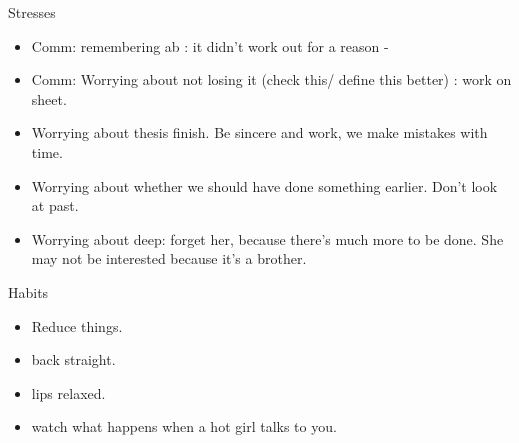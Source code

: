 \documentclass[serif, mathserif, final]{beamer}
\begin{document}
\begin{frame}{}
\begin{columns}
\begin{column}{0.25\linewidth}
\begin{block}{ Stresses}
\begin{itemize}
    \item \tiny Comm: remembering ab : it didn't work out for a reason - 
    \item \tiny Comm: Worrying about not losing it (check this/ define this better) : work on sheet.  

    \item \tiny Worrying about thesis finish. Be sincere and work, we make mistakes with time. 
    \item \tiny Worrying about whether we should have done something earlier. Don't look at past. 

    \item \tiny Worrying about deep: forget her, because there's much more to be done.  She may not be interested because it's a brother. 
    \end{itemize} 
  \end{block} 

  \begin{block}{ Habits } 
    \begin{itemize} 
      \item \tiny Reduce things. 
      \tiny \item \tiny back straight. 
    \item \tiny lips relaxed. 
    \item \tiny watch what happens when a hot girl talks to you. 
    \end{itemize} 
  \end{block} 


\end{column}
\end{columns}
\end{frame}
\end{document}
